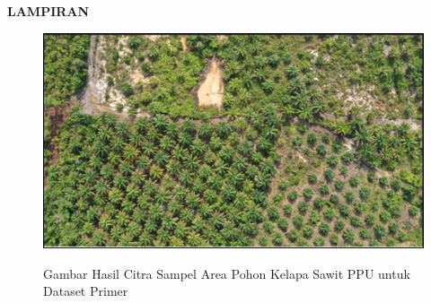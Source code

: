 \begin{center}
\begin{large}\textbf{LAMPIRAN}\\\end{large}
\end{center}

\begin{figure}[H]
	\vspace{-0.1cm}
	\begin{center}
		\includegraphics[width=1\columnwidth]{lampiran/Picture1.png}
	\end{center}
	\vspace{-0.2cm}
	\captionsetup{justification=centering}
	Gambar Hasil Citra Sampel Area Pohon Kelapa Sawit PPU untuk Dataset Primer
\end{figure}

